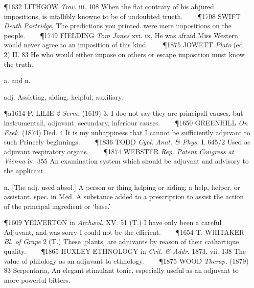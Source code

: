 \begin{description}[wide, labelwidth=!, labelindent=0pt]
\begin{myenumerate}
\P 1632 LITHGOW  \textit{Trav.} iii. 108 When the flat contrary of his abjured impositions, is infallibly knowne to be of undoubted trueth.    
\P 1708 SWIFT  \textit{Death Partridge}, The predictions you printed..were mere impositions on the people.    
\P 1749 FIELDING  \textit{Tom Jones} xvi. ix, He was afraid Miss Western would never agree to an imposition of this kind.    
\P 1875 JOWETT  \textit{Plato} (ed. 2) II. 83 He who would either impose on others or escape imposition must know the truth.
\end{myenumerate}

 a. and n.

\noindent {}

\vspace{-0.3cm}

\begin{myenumerate}

 adj. Assisting, aiding, helpful, auxiliary.

\P a1614 P. LILIE  \textit{2 Serm.} (1619) 3, I doe not say they are principall causes, but instrumentall, adjuvant, secundary, inferiour causes.    
\P 1650 GREENHILL  \textit{On Ezek.} (1874) Ded. 4 It is my unhappiness that I cannot be sufficiently adjuvant to such Princely beginnings.    
\P 1836 TODD  \textit{Cycl. Anat. \& Phys.} I. 645/2 Used as adjuvant respiratory organs.    
\P 1874 WEBSTER  \textit{Rep. Patent Congress at Vienna} iv. 355 An examination system which should be adjuvant and advisory to the applicant.

 n. [The adj. used absol.] A person or thing helping or aiding; a help, helper, or assistant. spec. in Med. A substance added to a prescription to assist the action of the principal ingredient or ‘base.’

\P 1609 YELVERTON in  \textit{Archæol.} XV. 51 (T.) I have only been a careful Adjuvant, and was sorry I could not be the efficient.    
\P 1654 T. WHITAKER  \textit{Bl. of Grape} 2 (T.) These [plants] are adjuvants by reason of their cathartique quality.    
\P 1865 HUXLEY ETHNOLOGY in  \textit{Crit. \& Addr.} 1873, vii. 138 The value of philology as an adjuvant to ethnology.    
\P 1875 WOOD  \textit{Therap.} (1879) 83 Serpentaria, An elegant stimulant tonic, especially useful as an adjuvant to more powerful bitters.
\end{myenumerate}



\end{description}
